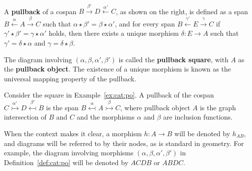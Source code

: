 \begin{definition}
    \label{def:cat:pb}
    \ \newline
\noindent
\begin{minipage}{0.7\textwidth}  
   A \textbf{pullback} of a cospan \(B \overset{\beta'}{\rightarrow} D \overset{\alpha'}{\leftarrow} C \), as shown on the right, is defined as a span \( B \overset{\alpha}{\leftarrow} A \overset{\beta}{\rightarrow} C \) such that \( \alpha \mathop{\star} \beta' \mathop{=} \beta \mathop{\star} \alpha' \), and for every span \( B \overset{\gamma'}{\leftarrow} E \overset{\gamma}{\rightarrow} C \) if \(\gamma' \mathop{\star} \beta' \mathop{=} \gamma \mathop{\star} \alpha'\) holds, then there exists a unique morphism \(\delta: E \mathop{\to} A\) such that $\gamma' \mathop{=} \delta \mathop{\star} \alpha$ and $\gamma \mathop{=} \delta \mathop{\star} \beta$. 
\end{minipage}
\hfill
\begin{minipage}{0.299\textwidth}
    \hfill
{}
\end{minipage}
The diagram involving \( (\alpha, \beta, \alpha', \beta') \) is called the \textbf{pullback square}, with \(A\) as the \textbf{pullback object}. The existence of a unique morphism is known as the universal mapping property of the pullback.
\end{definition} 
 
\begin{definition}
    \label{def:cat:pb}
    Consider the square in Example~\ref{ex:cat:po}. A pullback of the cospan \( C \overset{\alpha'}{\rightarrowtail} D \overset{\beta'}{\leftarrowtail} B \) is the span \( B \overset{\alpha}{\leftarrowtail} A \overset{\beta}{\rightarrowtail} C \), where pullback object \( A \) is the graph intersection of $B$ and $C$ and the morphisms \( \alpha \) and \( \beta \) are inclusion functions.
\end{definition}
\begin{notation}
    When the context makes it clear, a morphism \( h : A \mathop{\to} B \) will be denoted by \( h_{AB} \), and diagrams will be referred to by their nodes, as is standard in geometry. For example, the diagram involving morphisms \( ( \alpha, \beta, \alpha', \beta' ) \) in Definition~\ref{def:cat:po} will be denoted by \( ACDB \) or \( ABDC \).
\end{notation}   